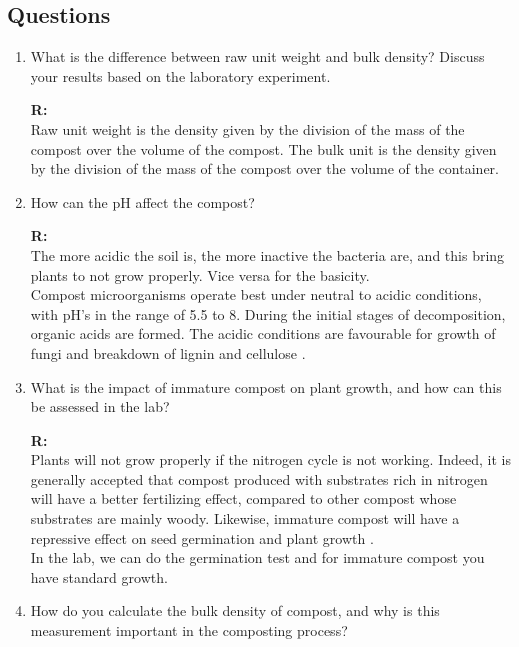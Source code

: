 \documentclass{article}
\begin{document}
\subsection{Questions}
\begin{enumerate}
    \item What is the difference between raw unit weight and bulk density? Discuss your
        results based on the laboratory experiment.

        \textbf{R:\\}
        Raw unit weight is the density given by the division of the mass of the compost
        over the volume of the compost. The bulk unit is the density given by the division
        of the mass of the compost over the volume of the container.

    \item How can the pH affect the compost?
    
        \textbf{R:\\}
        The more acidic the soil is, the more inactive the bacteria are, and this bring
        plants to not grow properly. Vice versa for the basicity.\\
        Compost microorganisms operate best under neutral to acidic conditions, with pH's
        in the range of 5.5 to 8. During the initial stages of decomposition, organic
        acids are formed. The acidic conditions are favourable for growth of fungi and
        breakdown of lignin and cellulose \parencite{cornell}.

    \item What is the impact of immature compost on plant growth, and how can this be
        assessed in the lab?

        \textbf{R:\\}
        Plants will not grow properly if the nitrogen cycle is not working. Indeed, it is
        generally accepted that compost produced with substrates rich in nitrogen will
        have a better fertilizing effect, compared to other compost whose substrates are
        mainly woody. Likewise, immature compost will have a repressive effect on seed
        germination and plant growth \parencite{tamakloe2021}.\\
        In the lab, we can do the germination test and for immature compost you have
        standard growth.

    \item How do you calculate the bulk density of compost, and why is this measurement
        important in the composting process?


\end{enumerate}
\end{document}
